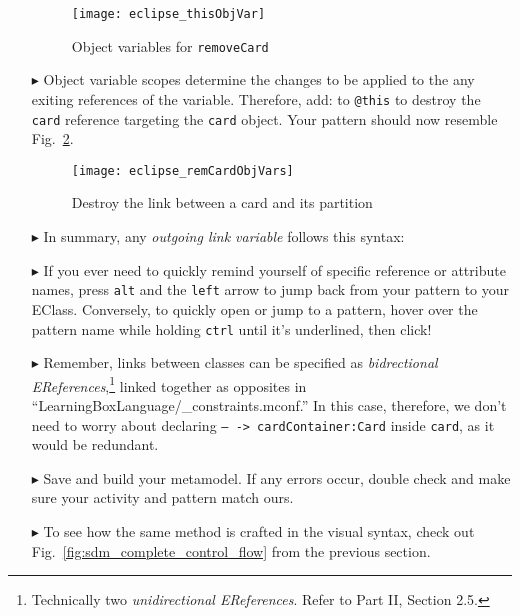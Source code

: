 \begin{itemize}
\begin{figure}[htp]
\begin{center}
  \texttt{[image: eclipse\_thisObjVar]}
  \caption{Object variables for \texttt{removeCard}}
  \label{fig:remCardObjVar}
\end{center}
\end{figure}

\item[$\blacktriangleright$] Object variable scopes determine the changes to be applied to the any exiting references of the variable. Therefore, add:
 to \texttt{@this} to destroy the \texttt{card} reference targeting the \texttt{card} object. Your pattern should now resemble
Fig.~\ref{fig:deleteReference}. 

\begin{figure}[htp]
\begin{center}
    \texttt{[image: eclipse\_remCardObjVars]}
  \caption{Destroy the link between a card and its partition}
  \label{fig:deleteReference}
\end{center}
\end{figure}
\newpage

\item[$\blacktriangleright$] In summary, any \emph{outgoing link variable} follows this syntax:


\item[$\blacktriangleright$] If you ever need to quickly remind yourself of specific reference or attribute names, press \texttt{alt} and the \texttt{left}
arrow to jump back from your pattern to your EClass. Conversely, to quickly open or jump to a pattern, hover over the pattern name while holding \texttt{ctrl}
until it's underlined, then click!

\item[$\blacktriangleright$] Remember, links between classes can be specified as \emph{bidrectional EReferences},\footnote{Technically two
\emph{unidirectional EReferences}. Refer to Part II, Section 2.5.} linked together as opposites in ``LearningBoxLanguage/\_con\-straints.mconf.'' In this case,
therefore, we don't need to worry about declaring \texttt{-- -> cardContainer:Card} inside \texttt{card}, as it would be redundant.

\item[$\blacktriangleright$] Save and build your metamodel. If any errors occur, double check and make sure your activity and pattern match ours. 

\item[$\blacktriangleright$] To see how the same method is crafted in the visual syntax, check out Fig.~\ref{fig:sdm_complete_control_flow} from the previous
section.

\end{itemize}
